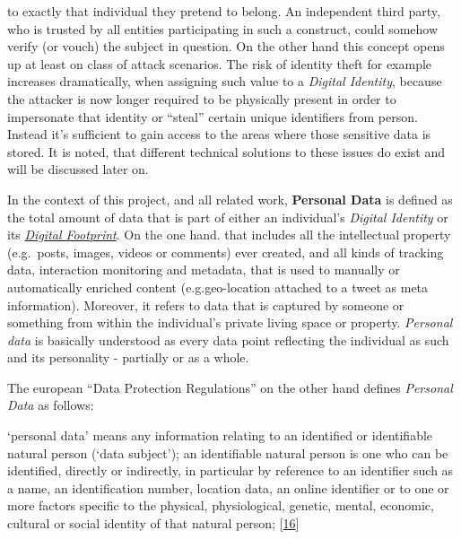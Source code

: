 \documentclass[12pt,english,a4paper,titlepage,cleardoublepage=empty,dottedtoc]{report}
\let\origquote\quote
\let\endorigquote\endquote
\renewenvironment{quote}{%
    \origquote
    \itshape
}
{\endorigquote}
\begin{document}
to exactly that individual they pretend to belong. An independent third
party, who is trusted by all entities participating in such a construct,
could somehow verify (or vouch) the subject in question. On the other
hand this concept opens up at least on class of attack scenarios. The
risk of identity theft for example increases dramatically, when
assigning such value to a \emph{Digital Identity}, because the attacker
is now longer required to be physically present in order to impersonate
that identity or ``steal'' certain unique identifiers from person.
Instead it's sufficient to gain access to the areas where those
sensitive data is stored. It is noted, that different technical
solutions to these issues do exist and will be discussed later on.

In the context of this project, and all related work,
\textbf{\protect\hypertarget{def--personal-data}{}{Personal Data}} is
defined as the total amount of data that is part of either an
individual's \emph{Digital Identity} or its
\emph{\protect\hyperlink{terminologies--digital-footprint}{Digital
Footprint}}. On the one hand. that includes all the intellectual
property (e.g.~posts, images, videos or comments) ever created, and all
kinds of tracking data, interaction monitoring and metadata, that is
used to manually or automatically enriched content (e.g.geo-location
attached to a tweet as meta information). Moreover, it refers to data
that is captured by someone or something from within the individual's
private living space or property. \emph{Personal data} is basically
understood as every data point reflecting the individual as such and its
personality - partially or as a whole.

The european ``Data Protection Regulations'' on the other hand defines
\emph{\protect\hypertarget{def--personal-data-as-of-legis}{}{Personal
Data}} as follows:

\begin{quote}
`personal data' means any information relating to an identified or
identifiable natural person (`data subject'); an identifiable natural
person is one who can be identified, directly or indirectly, in
particular by reference to an identifier such as a name, an
identification number, location data, an online identifier or to one or
more factors specific to the physical, physiological, genetic, mental,
economic, cultural or social identity of that natural person;
{[}\protect\hyperlink{ref-regulation_2016_eu_general-data-protection-regulation_definition}{16}{]}
\end{quote}
\end{document}
